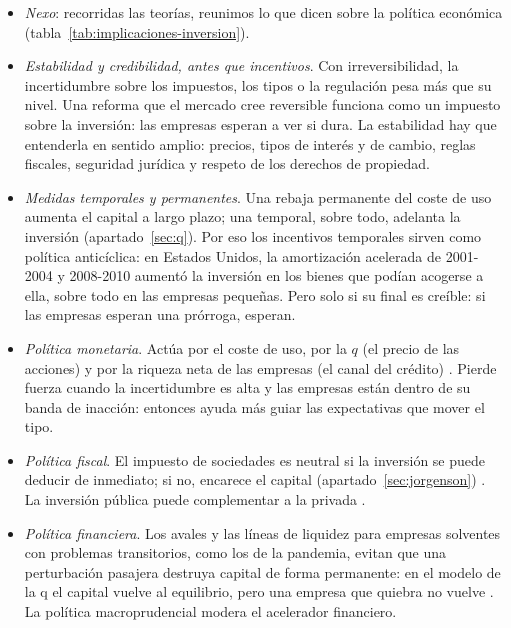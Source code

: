\documentclass[11pt]{article}
\begin{document}
\begin{itemize}
\item \emph{Nexo}: recorridas las teorías, reunimos lo que dicen sobre la política económica (tabla~\ref{tab:implicaciones-inversion}).
\item \emph{Estabilidad y credibilidad, antes que incentivos}. Con irreversibilidad, la incertidumbre sobre los impuestos, los tipos o la regulación pesa más que su nivel\nocite{Pindyck1991Irreversibility}. Una reforma que el mercado cree reversible funciona como un impuesto sobre la inversión: las empresas esperan a ver si dura\nocite{Rodrik1991Policy}. La estabilidad hay que entenderla en sentido amplio: precios, tipos de interés y de cambio, reglas fiscales, seguridad jurídica y respeto de los derechos de propiedad.
\item \emph{Medidas temporales y permanentes}. Una rebaja permanente del coste de uso aumenta el capital a largo plazo; una temporal, sobre todo, adelanta la inversión (apartado~\ref{sec:q}). Por eso los incentivos temporales sirven como política anticíclica: en Estados Unidos, la amortización acelerada de 2001-2004 y 2008-2010 aumentó la inversión en los bienes que podían acogerse a ella, sobre todo en las empresas pequeñas\nocite{HouseShapiro2008Temporary,ZwickMahon2017Tax}. Pero solo si su final es creíble: si las empresas esperan una prórroga, esperan.
\item \emph{Política monetaria}. Actúa por el coste de uso, por la $q$ (el precio de las acciones) y por la riqueza neta de las empresas (el canal del crédito) . Pierde fuerza cuando la incertidumbre es alta y las empresas están dentro de su banda de inacción: entonces ayuda más guiar las expectativas que mover el tipo.
\item \emph{Política fiscal}. El impuesto de sociedades es neutral si la inversión se puede deducir de inmediato; si no, encarece el capital (apartado~\ref{sec:jorgenson})  . La inversión pública puede complementar a la privada .
\item \emph{Política financiera}. Los avales y las líneas de liquidez para empresas solventes con problemas transitorios, como los de la pandemia, evitan que una perturbación pasajera destruya capital de forma permanente: en el modelo de la q el capital vuelve al equilibrio, pero una empresa que quiebra no vuelve . La política macroprudencial modera el acelerador financiero.
\end{itemize}
\end{document}
